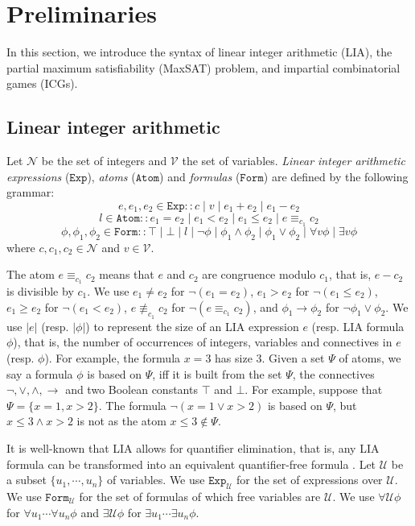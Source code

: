 \documentclass[review]{elsarticle}
\newcommand{\Exp}{\mathtt{Exp}}
\newcommand{\atom}{\mathtt{Atom}}
\newcommand{\formula}{\mathtt{Form}}
\newcommand{\qfformula}{\mathtt{Form}^{\mathtt{qf}}}
\newcommand{\set}[1]{\{ #1 \}}
\newcommand{\true}{\top}
\newcommand{\false}{\bot}
\newcommand{\intNum}{\mathcal{N}}
\newcommand{\varSet}{\mathcal{V}}
\newcommand{\varSubSet}{\mathcal{U}}
\newcommand{\len}[1][]{|#1|}
\newcommand{\modulo}{\equiv}
\newcommand{\nmodulo}{\not \equiv}
\newcommand{\featureSet}{\Psi}
\begin{document}
\section{Preliminaries}
	In this section, we introduce the syntax of linear integer arithmetic (LIA), the partial maximum satisfiability (MaxSAT) problem, and impartial combinatorial games (ICGs).
	
	\subsection{Linear integer arithmetic} \label{sec:LIA}
	Let $\intNum$ be the set of integers and $\varSet$ the set of variables.
	\textit{Linear integer arithmetic expressions} ($\Exp$), \textit{atoms} ($\atom$) and \textit{formulas} ($\formula$) are defined by the following grammar:
	\[ e, e_1, e_2 \in \Exp :: c \mid v \mid e_1 + e_2 \mid e_1 - e_2 \]
	\[ l \in \atom :: e_1 = e_2 \mid e_1 < e_2 \mid e_1 \leq e_2 \mid  e \modulo_{c_1} c_2 \]
	\[\phi, \phi_1, \phi_2 \in \formula :: \true \mid \false \mid l \mid \neg \phi \mid \phi_1 \land \phi_2 \mid \phi_1 \lor \phi_2 \mid \forall v \phi \mid \exists v \phi \]
	where $c, c_1, c_2 \in \intNum$ and $v \in \varSet$.
	
	The atom $e \modulo_{c_1} c_2$ means that $e$ and $c_2$ are congruence modulo $c_1$, that is, $e - c_2$ is divisible by $c_1$.
	We use $e_1 \neq e_2$ for $\neg (e_1 = e_2)$, $e_1 > e_2$ for $\neg (e_1 \leq e_2)$, $e_1 \geq e_2$ for $\neg (e_1 < e_2)$, $e \nmodulo_{c_1} c_2$ for $\neg (e \modulo_{c_1} c_2)$, and $\phi_1 \rightarrow \phi_2$ for $\neg \phi_1 \lor \phi_2$.
	We use $\len[e]$ (resp. $\len[\phi]$) to represent the size of an LIA expression $e$ (resp. LIA formula $\phi$), that is, the number of occurrences of integers, variables and connectives in $e$ (resp. $\phi$).
	For example, the formula $x = 3$ has size $3$.
	Given a set $\featureSet$ of atoms, we say a formula $\phi$ is based on $\featureSet$, iff it is built from the set $\featureSet$, the connectives $\neg, \vee, \wedge, \rightarrow$ and two Boolean constants $\true$ and $\false$.
	For example, suppose that $\featureSet = \set{x = 1, x > 2}$.
	The formula $\neg (x = 1 \lor x > 2)$ is based on $\featureSet$, but $x \leq 3 \land x > 2$ is not as the atom $x \leq 3 \notin \featureSet$.	
	
	It is well-known that LIA allows for quantifier elimination, that is, any LIA formula can be transformed into an equivalent quantifier-free formula \cite{Coo1972,Mon2010}.
	Let $\varSubSet$ be a subset $\set{u_1, \cdots, u_n}$ of variables.
	We use $\Exp_{\varSubSet}$ for the set of expressions over $\varSubSet$.
	We use $\formula_{\varSubSet}$ for the set of formulas of which free variables are $\varSubSet$.
	We use $\forall \varSubSet \phi$ for $\forall u_1 \cdots \forall u_n \phi$ and $\exists \varSubSet \phi$ for $\exists u_1 \cdots \exists u_n \phi$. 
	
\end{document}

